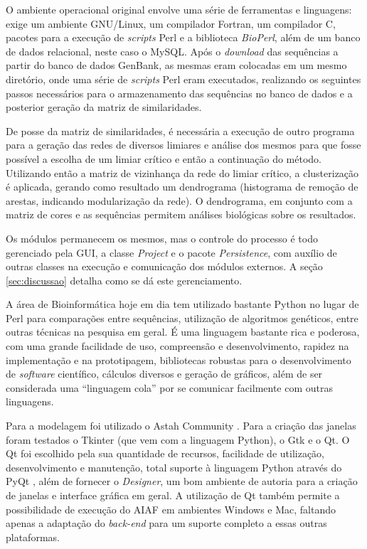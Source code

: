 O ambiente operacional original
envolve uma série de ferramentas e linguagens: exige um ambiente GNU/Linux, um compilador Fortran, um compilador C, pacotes para
a execução de \textit{scripts} Perl e a biblioteca \textit{BioPerl}, além de um banco de dados relacional, neste caso o MySQL. Após o \textit{download} das
sequências a partir do banco de dados GenBank, as mesmas eram colocadas em um mesmo diretório, onde uma série de \textit{scripts} Perl eram executados,
realizando os seguintes passos necessários para o armazenamento das sequências no banco de dados e a posterior geração da matriz de similaridades.

De posse da matriz de similaridades, é necessária a execução de outro programa para a geração das redes de diversos limiares e análise dos mesmos para que
fosse possível a escolha de um limiar crítico e então a continuação do método.
Utilizando então a matriz de vizinhança da rede do limiar crítico, a clusterização é aplicada, gerando como
resultado um dendrograma (histograma de remoção de arestas, indicando modularização da rede). O dendrograma, em conjunto com a matriz de cores e as sequências
permitem análises biológicas sobre os resultados.

Os módulos permanecem os mesmos, mas o controle do processo é todo gerenciado pela GUI, a classe \textit{Project} e o pacote \textit{Persistence},
com auxílio de
outras classes na execução e comunicação dos módulos externos. A seção \ref{sec:discussao} detalha como se dá este gerenciamento.

A área de Bioinformática hoje em dia tem utilizado bastante Python \cite{python} no lugar de Perl para comparações entre sequências, utilização de algoritmos
genéticos, entre outras técnicas na pesquisa em geral. É uma linguagem bastante rica e poderosa, com uma grande facilidade de uso, compreensão e
desenvolvimento, rapidez na implementação e na prototipagem, bibliotecas robustas para o desenvolvimento de \textit{software} científico, cálculos
diversos e geração de gráficos, além de ser considerada uma ``linguagem cola'' por se comunicar facilmente com outras linguagens.

Para a modelagem foi utilizado o Astah Community \cite{astah}. Para a criação das janelas foram testados o Tkinter (que vem com a linguagem Python), o Gtk
e o Qt. O Qt foi escolhido pela sua quantidade de recursos, facilidade de utilização, desenvolvimento e manutenção, total suporte à linguagem Python através
do PyQt \cite{pyqt}, além de fornecer o \textit{Designer}, um bom ambiente de autoria para a criação de janelas e interface gráfica em geral.
A utilização de Qt também permite a possibilidade de execução do AIAF em ambientes Windows e Mac,
faltando apenas a adaptação do \textit{back-end} para um suporte completo a essas outras plataformas.

